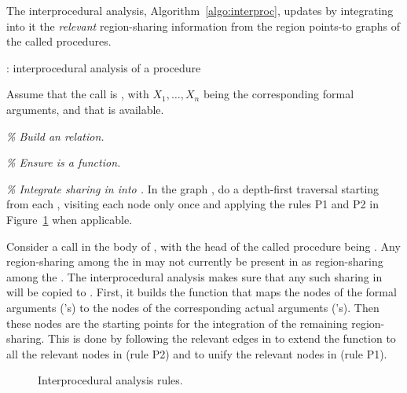 \documentclass{tlp}
\newcommand{\args}[2][X]{\ensuremath{#1_1, \ldots, #1_#2}}
\begin{document}
The interprocedural analysis, Algorithm~\ref{algo:interproc},
updates  by integrating into it
the \emph{relevant} region-sharing information
from the region points-to graphs of the called procedures.

\begin{algorithm}
    \small
    \caption{:
    interprocedural analysis of a procedure }
    \label{algo:interproc}
\begin{algorithmic}

    \REPEAT
            \STATE Assume that the call is ,
            with \args[X]{n} being the corresponding formal arguments,
            and that  is available.

            \STATE
            \STATE \emph{\% Build an  relation.}
                \STATE 
            \ENDFOR

            \STATE
            \STATE \emph{\% Ensure  is a function.}
            \FORALL{}
                \IF{}
                    \STATE  
                \ENDIF
            \ENDFOR

            \STATE
            \STATE \emph{\% Integrate sharing in  into .}
            \STATE In the graph , do a depth-first traversal
                starting from each ,
                visiting each node only once
                and applying the rules P1 and P2 in
                Figure~\ref{fig:inter:rules} when applicable.
        \ENDFOR

\end{algorithmic}
\normalsize
\end{algorithm}

\sloppy
Consider a call  in the body of ,
with the head of the called procedure being .
Any region-sharing among the  in 
may not currently be present in  as region-sharing among the .
The interprocedural analysis makes sure that
any such sharing in  will be copied to .
First, it builds the function  that
maps the nodes of the formal arguments ('s)
to the nodes of the corresponding actual arguments ('s).
Then these nodes are the starting points for the
integration of the remaining region-sharing.
This is done by following the relevant edges in 
to extend the  function to all the relevant nodes in  (rule P2)
and to unify the relevant nodes in  (rule P1).

\begin{figure}
\centering
\framebox{

}
\small
\caption{Interprocedural analysis rules.}
\normalsize
\label{fig:inter:rules}
\end{figure}
\end{document}
